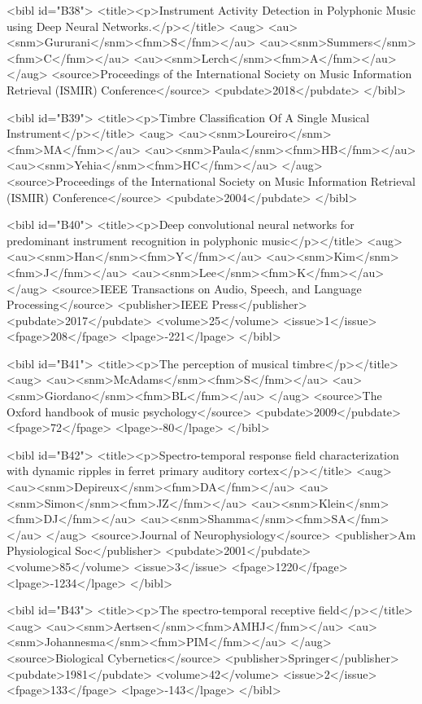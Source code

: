 \documentclass{bmcart}
\begin{document}
\begin{backmatter}
{<bibl id="B38">
  <title><p>Instrument Activity Detection in Polyphonic Music using Deep Neural
  Networks.</p></title>
  <aug>
    <au><snm>Gururani</snm><fnm>S</fnm></au>
    <au><snm>Summers</snm><fnm>C</fnm></au>
    <au><snm>Lerch</snm><fnm>A</fnm></au>
  </aug>
  <source>Proceedings of the International Society on Music Information
  Retrieval (ISMIR) Conference</source>
  <pubdate>2018</pubdate>
</bibl>

<bibl id="B39">
  <title><p>Timbre Classification Of A Single Musical Instrument</p></title>
  <aug>
    <au><snm>Loureiro</snm><fnm>MA</fnm></au>
    <au><snm>Paula</snm><fnm>HB</fnm></au>
    <au><snm>Yehia</snm><fnm>HC</fnm></au>
  </aug>
  <source>Proceedings of the International Society on Music Information
  Retrieval (ISMIR) Conference</source>
  <pubdate>2004</pubdate>
</bibl>

<bibl id="B40">
  <title><p>Deep convolutional neural networks for predominant instrument
  recognition in polyphonic music</p></title>
  <aug>
    <au><snm>Han</snm><fnm>Y</fnm></au>
    <au><snm>Kim</snm><fnm>J</fnm></au>
    <au><snm>Lee</snm><fnm>K</fnm></au>
  </aug>
  <source>IEEE Transactions on Audio, Speech, and Language Processing</source>
  <publisher>IEEE Press</publisher>
  <pubdate>2017</pubdate>
  <volume>25</volume>
  <issue>1</issue>
  <fpage>208</fpage>
  <lpage>-221</lpage>
</bibl>

<bibl id="B41">
  <title><p>The perception of musical timbre</p></title>
  <aug>
    <au><snm>McAdams</snm><fnm>S</fnm></au>
    <au><snm>Giordano</snm><fnm>BL</fnm></au>
  </aug>
  <source>The {O}xford handbook of music psychology</source>
  <pubdate>2009</pubdate>
  <fpage>72</fpage>
  <lpage>-80</lpage>
</bibl>

<bibl id="B42">
  <title><p>Spectro-temporal response field characterization with dynamic
  ripples in ferret primary auditory cortex</p></title>
  <aug>
    <au><snm>Depireux</snm><fnm>DA</fnm></au>
    <au><snm>Simon</snm><fnm>JZ</fnm></au>
    <au><snm>Klein</snm><fnm>DJ</fnm></au>
    <au><snm>Shamma</snm><fnm>SA</fnm></au>
  </aug>
  <source>Journal of Neurophysiology</source>
  <publisher>Am Physiological Soc</publisher>
  <pubdate>2001</pubdate>
  <volume>85</volume>
  <issue>3</issue>
  <fpage>1220</fpage>
  <lpage>-1234</lpage>
</bibl>

<bibl id="B43">
  <title><p>The spectro-temporal receptive field</p></title>
  <aug>
    <au><snm>Aertsen</snm><fnm>AMHJ</fnm></au>
    <au><snm>Johannesma</snm><fnm>PIM</fnm></au>
  </aug>
  <source>Biological Cybernetics</source>
  <publisher>Springer</publisher>
  <pubdate>1981</pubdate>
  <volume>42</volume>
  <issue>2</issue>
  <fpage>133</fpage>
  <lpage>-143</lpage>
</bibl>

}
\end{backmatter}
\end{document}
